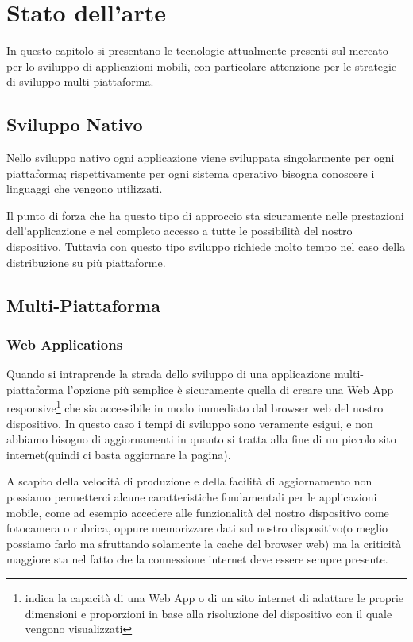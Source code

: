 \chapter{Stato dell'arte} 
In questo capitolo si presentano le tecnologie attualmente presenti sul mercato per lo sviluppo di applicazioni mobili, con particolare attenzione per le strategie di sviluppo multi piattaforma.
\section{Sviluppo Nativo}
Nello sviluppo nativo ogni applicazione viene sviluppata singolarmente per ogni piattaforma; rispettivamente per ogni sistema operativo bisogna conoscere i linguaggi che vengono utilizzati.


Il punto di forza che ha questo tipo di approccio sta sicuramente nelle prestazioni dell'applicazione e nel completo accesso a tutte le possibilità del nostro dispositivo. Tuttavia con questo tipo sviluppo richiede molto tempo nel caso della distribuzione su più piattaforme.
\section{Multi-Piattaforma}

\subsection{Web Applications}
Quando si intraprende la strada dello sviluppo di una applicazione multi-piattaforma l'opzione più semplice è sicuramente quella di creare una Web App responsive\footnote{indica la capacità di una Web App o di un sito internet di adattare le proprie dimensioni e proporzioni in base alla risoluzione del dispositivo con il quale vengono visualizzati} che sia accessibile in modo immediato dal browser web del nostro dispositivo. In questo caso i tempi di sviluppo sono veramente esigui, e non abbiamo bisogno di aggiornamenti in quanto si tratta alla fine di un piccolo sito internet(quindi ci basta aggiornare la pagina).

A scapito della velocità di produzione e della facilità di aggiornamento non possiamo permetterci alcune caratteristiche fondamentali per le applicazioni mobile, come ad esempio accedere alle funzionalità del nostro dispositivo come fotocamera o rubrica, oppure memorizzare dati sul nostro dispositivo(o meglio possiamo farlo ma sfruttando solamente la cache del browser web) ma la criticità maggiore sta nel fatto che la connessione internet deve essere sempre presente. 

